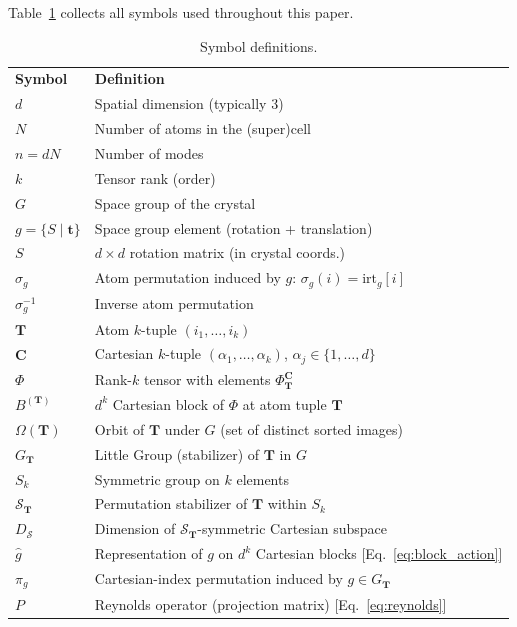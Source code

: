 \documentclass[twocolumn,amsmath,amssymb,aps,prb,10pt,floatfix]{revtex4-2}
\newcommand{\vT}{\mathbf{T}}
\newcommand{\vC}{\mathbf{C}}
\begin{document}
Table~\ref{tab:symbols} collects all symbols used throughout this paper.

\begin{table}[ht]
\caption{Symbol definitions.}
\label{tab:symbols}
\begin{ruledtabular}
\begin{tabular}{ll}
\textbf{Symbol} & \textbf{Definition} \\
\colrule
$d$              & Spatial dimension (typically 3) \\
$N$              & Number of atoms in the (super)cell \\
$n = dN$         & Number of modes \\
$k$              & Tensor rank (order) \\
$G$              & Space group of the crystal \\
$g = \{S \mid \mathbf{t}\}$ & Space group element (rotation + translation) \\
$S$              & $d \times d$ rotation matrix (in crystal coords.) \\
$\sigma_g$       & Atom permutation induced by $g$: $\sigma_g(i)=\mathrm{irt}_g[i]$ \\
$\sigma_g^{-1}$  & Inverse atom permutation \\
$\vT$            & Atom $k$-tuple $(i_1,\dots,i_k)$ \\
$\vC$            & Cartesian $k$-tuple $(\alpha_1,\dots,\alpha_k)$, $\alpha_j\in\{1,\dots,d\}$ \\
$\Phi$           & Rank-$k$ tensor with elements $\Phi_{\vT}^{\vC}$ \\
$B^{(\vT)}$      & $d^k$ Cartesian block of $\Phi$ at atom tuple $\vT$ \\
$\Omega(\vT)$    & Orbit of $\vT$ under $G$ (set of distinct sorted images) \\
$G_{\vT}$        & Little Group (stabilizer) of $\vT$ in $G$ \\
$S_k$            & Symmetric group on $k$ elements \\
$\mathcal{S}_{\vT}$ & Permutation stabilizer of $\vT$ within $S_k$ \\
$D_{\mathcal{S}}$ & Dimension of $\mathcal{S}_{\vT}$-symmetric Cartesian subspace \\
$\hat{g}$        & Representation of $g$ on $d^k$ Cartesian blocks [Eq.~\eqref{eq:block_action}] \\
$\pi_g$          & Cartesian-index permutation induced by $g \in G_{\vT}$ \\
$P$              & Reynolds operator (projection matrix) [Eq.~\eqref{eq:reynolds}] \\

\end{tabular}
\end{ruledtabular}
\end{table}
\end{document}
